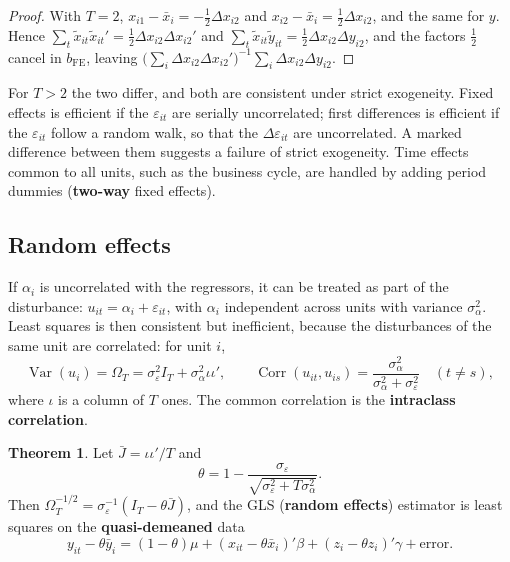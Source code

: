 \documentclass[11pt,a4paper]{article}
\numberwithin{equation}{section}
\DeclareMathOperator{\Var}{Var}
\DeclareMathOperator{\Corr}{Corr}
\theoremstyle{definition}
\newtheorem{thm}{Theorem}[subsection]
\begin{document}
\begin{proof}
With $T = 2$, $x_{i1} - \bar x_i = -\frac12\Delta x_{i2}$ and $x_{i2} - \bar x_i = \frac12\Delta x_{i2}$, and the same for $y$. Hence $\sum_t\tilde x_{it}\tilde x_{it}' = \frac12\Delta x_{i2}\Delta x_{i2}'$ and $\sum_t\tilde x_{it}\tilde y_{it} = \frac12\Delta x_{i2}\Delta y_{i2}$,
and the factors $\frac12$ cancel in $b_{\text{FE}}$, leaving $\bigl(\sum_i\Delta x_{i2}\Delta x_{i2}'\bigr)^{-1}\sum_i\Delta x_{i2}\Delta y_{i2}$.
\end{proof}

For $T > 2$ the two differ, and both are consistent under strict exogeneity. Fixed effects is efficient if the $\varepsilon_{it}$ are serially uncorrelated; first
differences is efficient if the $\varepsilon_{it}$ follow a random walk, so that the $\Delta\varepsilon_{it}$ are uncorrelated. A marked difference between them suggests a failure of strict
exogeneity. Time effects common to all units, such as the business cycle, are handled by adding period dummies (\textbf{two-way} fixed effects).

\subsection{Random effects}
\label{ssec:re}

If $\alpha_i$ is uncorrelated with the regressors, it can be treated as part of the disturbance: $u_{it} = \alpha_i + \varepsilon_{it}$, with $\alpha_i$ independent across units with variance $\sigma_\alpha^2$.
Least squares is then consistent but inefficient, because the disturbances of the same unit are correlated: for unit $i$,
\[
\Var(u_i) = \Omega_T = \sigma_\varepsilon^2I_T + \sigma_\alpha^2\iota\iota', \qquad \Corr(u_{it}, u_{is}) = \frac{\sigma_\alpha^2}{\sigma_\alpha^2 + \sigma_\varepsilon^2} \quad (t \neq s),
\]
where $\iota$ is a column of $T$ ones. The common correlation is the \textbf{intraclass correlation}.

\begin{thm}
\label{thm:re}
Let $\bar J = \iota\iota'/T$ and
\[
\theta = 1 - \frac{\sigma_\varepsilon}{\sqrt{\sigma_\varepsilon^2 + T\sigma_\alpha^2}} .
\]
Then $\Omega_T^{-1/2} = \sigma_\varepsilon^{-1}(I_T - \theta\bar J)$, and the GLS (\textbf{random effects}) estimator is least squares on the \textbf{quasi-demeaned} data
\[
y_{it} - \theta\bar y_i = (1 - \theta)\mu + (x_{it} - \theta\bar x_i)'\beta + (z_i - \theta z_i)'\gamma + \text{error} .
\]
\end{thm}
\end{document}
